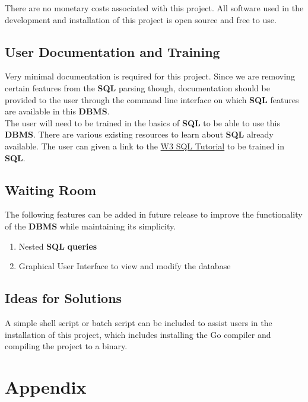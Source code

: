 \documentclass[12pt, titlepage]{article}
\begin{document}
There are no monetary costs associated with this project. All software used in the development and installation of this project is open source and free to use.

\subsection{User Documentation and Training}

Very minimal documentation is required for this project. Since we are removing certain features from the \textbf{SQL} parsing though, documentation should be provided to the user through the command line interface on which \textbf{SQL} features are available in this \textbf{DBMS}.\\

\noindent The user will need to be trained in the basics of \textbf{SQL} to be able to use this \textbf{DBMS}. There are various existing resources to learn about \textbf{SQL} already available. The user can given a link to the \href{https://www.w3schools.com/sql/}{W3 SQL Tutorial} to be trained in \textbf{SQL}.

\subsection{Waiting Room}

The following features can be added in future release to improve the functionality of the \textbf{DBMS} while maintaining its simplicity.

\begin{enumerate}[{FR}1.]
    \item Nested \textbf{SQL} \textbf{queries}
    \item Graphical User Interface to view and modify the database
\end{enumerate}

\subsection{Ideas for Solutions}

A simple shell script or batch script can be included to assist users in the installation of this project, which includes installing the Go compiler and compiling the project to a binary.





\newpage

\section{Appendix}
\end{document}
